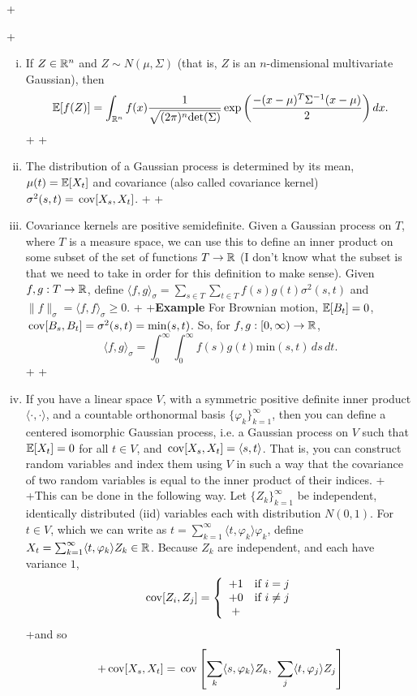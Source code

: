 +\documentclass{article}
\begin{document}
+\begin{enumerate}[(i)]
+
+\item If $Z\in\mathbb{R}^n$ and $Z\sim N(\mu,\Sigma)$ (that is, $Z$ is an $n$-dimensional multivariate Gaussian), then \[\mathbb{E}[f(Z)]=\int_{\mathbb{R}^n}f(x)\dfrac{1}{\sqrt{(2\pi)^n\mathrm{det}(\Sigma)}}\exp\left(\dfrac{-(x-\mu)^T\Sigma^{-1}(x-\mu)}{2}\right)dx.\]
+
+\item The distribution of a Gaussian process is determined by its mean, $\mu(t)=\mathbb{E}[X_t]$ and covariance (also called covariance kernel) $\sigma^2(s,t)=\,\mathrm{cov}[X_s,X_t]$.
+
+\item Covariance kernels are positive semidefinite.  Given a Gaussian process on $T$, where $T$ is a measure space, we can use this to define an inner product on some subset of the set of functions $T\to\mathbb{R}$ (I don't know what the subset is that we need to take in order for this definition to make sense).  Given $f,g:T\to \mathbb{R}$, define $\langle f,g\rangle_{\sigma}=\sum_{s\in T}\sum_{t\in T}f(s)g(t)\sigma^2(s,t)$ and $\|f\|_\sigma=\langle f,f\rangle_\sigma\geq 0$.
+
+\textbf{Example} For Brownian motion, $\mathbb{E}[B_t]=0$, $\,\mathrm{cov}[B_s,B_t]=\sigma^2(s,t)=\mathrm{min}(s,t)$.  So, for $f,g:[0,\infty)\to\mathbb{R}$, \[\langle f,g\rangle_\sigma=\int_0^\infty\int_0^\infty f(s)g(t)\mathrm{min}(s,t)\,ds\,dt.\]
+
+\item If you have a linear space $V$, with a symmetric positive definite inner product $\langle\cdot,\cdot \rangle$, and a countable orthonormal basis $\{\varphi_k\}_{k=1}^{\infty}$, then you can define a centered isomorphic Gaussian process, i.e. a Gaussian process on $V$ such that $\mathbb{E}[X_t]=0$ for all $t\in V$, and $\,\mathrm{cov}[X_s,X_t]=\langle s,t\rangle$.  That is, you can construct random variables and index them using $V$ in such a way that the covariance of two random variables is equal to the inner product of their indices.
+
+This can be done in the following way.  Let $\{Z_k\}_{k=1}^\infty$ be independent, identically distributed (iid) variables each with distribution $N(0,1)$.  For $t\in V$, which we can write as $t=\sum_{k=1}^\infty \langle t,\varphi_k\rangle \varphi_k$, define $X_t=\sum_{k=1}^\infty \langle t,\varphi_k\rangle Z_k\in\mathbb{R}$.  Because $Z_k$ are independent, and each have variance $1$, \[\,\mathrm{cov}[Z_i,Z_j]=\left\{\begin{array}{cc}
+1 & \text{if }i=j\\
+0 & \text{if }i\neq j\\
+\end{array}\right.\]
+and so \begin{align*}
+\cov[X_s,X_t]&=\cov\left[\sum_k\langle s,\varphi_k\rangle Z_k,\,\,\sum_j\langle t,\varphi_j\rangle Z_j\right]\\

\end{align*}
\end{enumerate}
\end{document}
